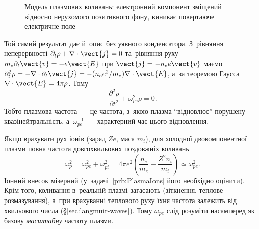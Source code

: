 \begin{figure}[h!]\centering
	\begin{subfigure}[t]{0.5\linewidth}\centering
	\end{subfigure}%
	\begin{subfigure}[t]{0.5\linewidth}\centering
	\end{subfigure}
	\caption{Модель плазмових коливань: електронний компонент зміщений відносно нерухомого
	позитивного фону, виникає повертаюче електричне поле}
	\label{pic:plasma-oscillations}
\end{figure}

Той самий результат дає й~опис без уявного конденсатора. З~рівняння неперервності
$\partial_t\rho+\nabla\cdot\vect{j}=0$ та~рівняння руху $m_e\partial_t\vect{v}=-e\vect{E}$
при $\vect{j}=-n_ee\vect{v}$ маємо
$\partial_t^2\rho=-\nabla\cdot\partial_t\vect{j}=-(n_ee^2/m_e)\nabla\cdot\vect{E}$, а~за
теоремою Гаусса $\nabla\cdot\vect{E}=4\pi\rho$. Тому
\begin{equation*}
	\frac{\partial^2\rho}{\partial t^2}+\omega_{pe}^2\rho=0.
\end{equation*}
Тобто плазмова частота~--- це частота, з~якою плазма \enquote{відновлює} порушену
квазінейтральність, а~$\omega_{pe}^{-1}$~--- характерний час цього відновлення.

Якщо врахувати рух іонів (заряд $Ze$, маса $m_i$), для холодної двокомпонентної плазми
повна частота довгохвильових поздовжніх коливань
\begin{equation*}
	\omega_p^2=\omega_{pe}^2+\omega_{pi}^2=4\pi e^2\left(\frac{n_e}{m_e}+\frac{Z^2n_i}{m_i}\right)\simeq\omega_{pe}^2.
\end{equation*}
Іонний внесок мізерний (у~задачі~\ref{prb:PlasmaIons} його необхідно оцінити). Крім того,
коливання в~реальній плазмі загасають (зіткнення, теплове розмазування), а~при врахуванні
теплового руху їхня частота залежить від хвильового числа (§\ref{sec:langmuir-waves}).
Тому $\omega_{pe}$ слід розуміти насамперед як базову \emph{масштабну} частоту плазми.



